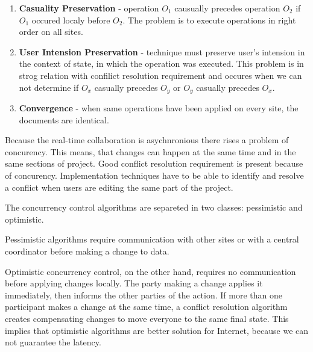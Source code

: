 \documentclass[12pt,oneside]{fithesis2}
\begin{document}
\begin{enumerate}
\item \textbf{Casuality Preservation} - operation \(O_{1}\) causually precedes operation \(O_{2}\) if \(O_{1}\) occured localy before \(O_{2}\). The problem is to execute operations in right order on all sites.
\item \textbf{User Intension Preservation} - technique must preserve user's intension in the context of state, in which the operation was executed. This problem is in strog relation with confilict resolution requirement and occures when we can not determine if \(O_{x}\) casually precedes \(O_{y}\) or \(O_{y}\) casually precedes \(O_{x}\).
\item \textbf{Convergence} - when same operations have been applied on every site, the documents are identical.
\end{enumerate}
\par Because the real-time collaboration is asychnronious there rises a problem of concurency. This means, that changes can happen at the same time and in the same sections of project. Good conflict resolution requirement is present because of concurency. Implementation techniques have to be able to identify and resolve a conflict when users are editing the same part of the project. \par The concurrency control algorithms are separeted in two classes: pessimistic and optimistic. \par Pessimistic algorithms require communication with other sites or with a central coordinator before making a change to data. \par Optimistic concurrency control, on the other hand, requires no communication before applying changes locally. The party making a change applies it immediately, then informs the other parties of the action. If more than one participant makes a change at the same time, a conflict resolution algorithm creates compensating changes to move everyone to the same final state.\cite{Jupiter} This implies that optimistic algorithms are better solution for Internet, because we can not guarantee the latency.
\end{document}
